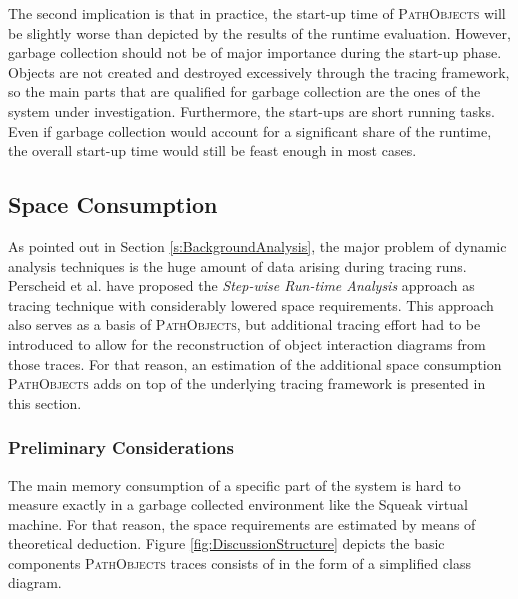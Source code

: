 The second implication is that in practice, the start-up time of \textsc{PathObjects} will be slightly worse than depicted by the results of the runtime evaluation.
However, garbage collection should not be of major importance during the start-up phase.
Objects are not created and destroyed excessively through the tracing framework, so the main parts that are qualified for garbage collection are the ones of the system under investigation.
Furthermore, the start-ups are short running tasks.
Even if garbage collection would account for a significant share of the runtime, the overall start-up time would still be feast enough in most cases.

\subsection{Space Consumption}
\label{ss:DiscussionSpace}
As pointed out in Section \ref{s:BackgroundAnalysis}, the major problem of dynamic analysis techniques is the huge amount of data arising during tracing runs.
Perscheid et al. have proposed the \emph{Step-wise Run-time Analysis} approach \cite{perscheid_immediacy_2010} as tracing technique with considerably lowered space requirements. 
This approach also serves as a basis of \textsc{PathObjects}, but additional tracing effort had to be introduced to allow for the reconstruction of object interaction diagrams from those traces.
For that reason, an estimation of the additional space consumption \textsc{PathObjects} adds on top of the underlying tracing framework is presented in this section.

\subsubsection{Preliminary Considerations}
The main memory consumption of a specific part of the system is hard to measure exactly in a garbage collected environment like the Squeak virtual machine.
For that reason, the space requirements are estimated by means of theoretical deduction.
Figure \ref{fig:DiscussionStructure} depicts the basic components \textsc{PathObjects} traces consists of in the form of a simplified class diagram.

